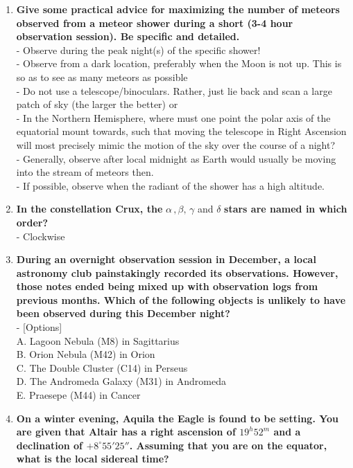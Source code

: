 \documentclass[a4paper,12pt]{extarticle}
\begin{document}
\begin{enumerate}
	
	\item \textbf{Give some practical advice for maximizing the number of meteors observed from a meteor shower during a short (3-4 hour observation session). Be specific and detailed.}\\
	
	- Observe during the peak night(s) of the specific shower!\\
	- Observe from a dark location, preferably when the Moon is not up. This is so as to see as many meteors as possible\\
	- Do not use a telescope/binoculars. Rather, just lie back and scan a large patch of sky (the larger the better) or\\
	- In the Northern Hemisphere, where must one point the polar axis of the equatorial mount towards, such that moving the telescope in Right Ascension will most precisely mimic the motion of the sky over the course of a night?\\ 
	- Generally, observe after local midnight as Earth would usually be moving into the stream of meteors then.\\
	- If possible, observe when the radiant of the shower has a high altitude.
	\item \textbf{In the constellation Crux, the} $\alpha\,, \beta, \,\gamma$ and $\delta$ \textbf{stars are named in which order?}\\
	- Clockwise
	\item \textbf{During an overnight observation session in December, a local astronomy club painstakingly recorded its observations. However, those notes ended being mixed up with observation logs from previous months. Which of the following objects is unlikely to have been observed during this December night?}\\
	
	- [Options] \\
	A. {\color{red} Lagoon Nebula (M8) in Sagittarius}\\
	B. Orion Nebula (M42) in Orion\\
	C. The Double Cluster (C14) in Perseus\\
	D. The Andromeda Galaxy (M31) in Andromeda\\
	E. Praesepe (M44) in Cancer
	
\item \textbf{On a winter evening, Aquila the Eagle is found to be setting. You are given that Altair has a right ascension of $19^h52^m$ and a declination of $+8^\circ55'25''$. Assuming that you are on the equator, what is the local sidereal time?}\\


\end{enumerate}
\end{document}
